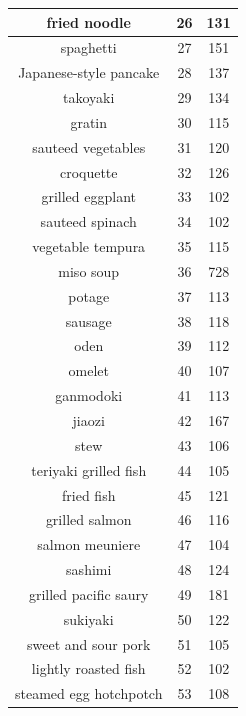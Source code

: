{\begin{longtable}{| c | c | c|}
        \hline
        fried noodle  &  26  &  131  \\
        \hline
        spaghetti  &  27  &  151  \\
        \hline
        Japanese-style pancake  &  28  &  137  \\
        \hline
        takoyaki  &  29  &  134  \\
        \hline
        gratin  &  30  &  115  \\
        \hline
        sauteed vegetables  &  31  &  120  \\
        \hline
        croquette  &  32  &  126  \\
        \hline
        grilled eggplant  &  33  &  102  \\
        \hline
        sauteed spinach  &  34  &  102  \\
        \hline
        vegetable tempura  &  35  &  115  \\
        \hline
        miso soup  &  36  &  728  \\
        \hline
        potage  &  37  &  113  \\
        \hline
        sausage  &  38  &  118  \\
        \hline
        oden  &  39  &  112  \\
        \hline
        omelet  &  40  &  107  \\
        \hline
        ganmodoki  &  41  &  113  \\
        \hline
        jiaozi  &  42  &  167  \\
        \hline
        stew  &  43  &  106  \\
        \hline
        teriyaki grilled fish  &  44  &  105  \\
        \hline
        fried fish  &  45  &  121  \\
        \hline
        grilled salmon  &  46  &  116  \\
        \hline
        salmon meuniere  &  47  &  104  \\
        \hline
        sashimi  &  48  &  124  \\
        \hline
        grilled pacific saury  &  49  &  181  \\
        \hline
        sukiyaki  &  50  &  122  \\
        \hline
        sweet and sour pork  &  51  &  105  \\
        \hline
        lightly roasted fish  &  52  &  102  \\
        \hline
        steamed egg hotchpotch  &  53  &  108  \\

\end{longtable}}
